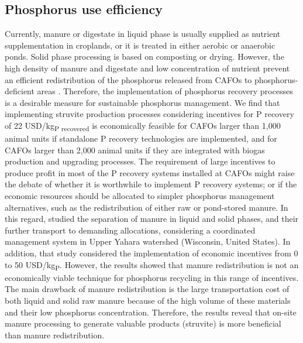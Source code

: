 \documentclass[authoryear]{elsarticle}
\begin{document}
\subsection{Phosphorus use efficiency}
Currently, manure or digestate in liquid phase is usually supplied as nutrient supplementation in croplands, or it is treated in either aerobic or anaerobic ponds. Solid phase processing is based on composting or drying. However, the high density of manure and digestate and low concentration of nutrient prevent an efficient redistribution of the phosphorus released from CAFOs to phosphorus-deficient areas \citep{burns2002phosphorus}. Therefore, the implementation of phosphorus recovery processes 
is a desirable measure for sustainable phosphorus management. 
We find that implementing struvite production processes considering incentives for P recovery of 22 USD/kg\textsubscript{P recovered} is economically feasible for CAFOs larger than 1,000 animal units if standalone P recovery technologies are implemented, and for CAFOs larger than 2,000 animal units if they are integrated with biogas production and upgrading processes. The requirement of large incentives to produce profit in most of the P recovery systems installed at CAFOs might raise the debate of whether it is worthwhile to implement P recovery systems; or if the economic resources should be allocated to simpler phosphorus management alternatives, such as the redistribution of either raw or pond-stored manure. In this regard, \citet{sampat2019coordinated} studied the separation of manure in liquid and solid phases, and their further transport to demanding allocations, considering a coordinated management system in Upper Yahara watershed (Wisconsin, United States). In addition, that study considered the implementation of economic incentives from 0 to 50 USD/kg\textsubscript{P}. However, the results showed that manure redistribution is not an economically viable technique for phosphorus recycling in this range of incentives. The main drawback of manure redistribution is the large transportation cost of both liquid and solid raw manure because of the high volume of these materials and their low phosphorus concentration. Therefore, the results reveal that on-site manure processing to generate valuable products (struvite) is more beneficial than manure redistribution.
\end{document}

